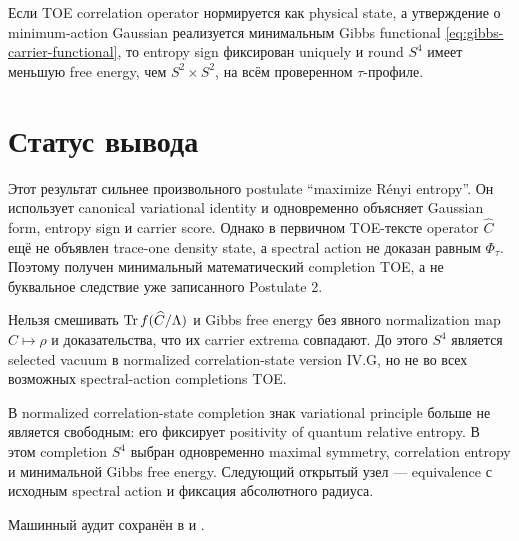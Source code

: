 \begin{proposition}
Если TOE correlation operator нормируется как physical state, а утверждение
о minimum-action Gaussian реализуется минимальным Gibbs functional
\eqref{eq:gibbs-carrier-functional}, то entropy sign фиксирован uniquely и
round \(S^4\) имеет меньшую free energy, чем
\(S^2\times S^2\), на всём проверенном \(\tau\)-профиле.
\end{proposition}

\section{Статус вывода}

Этот результат сильнее произвольного postulate ``maximize Rényi entropy''.
Он использует canonical variational identity и одновременно объясняет
Gaussian form, entropy sign и carrier score. Однако в первичном TOE-тексте
operator \(\widehat C\) ещё не объявлен trace-one density state, а spectral
action не доказан равным \(\Phi_\tau\). Поэтому получен минимальный
математический completion TOE, а не буквальное следствие уже записанного
Postulate 2.

\begin{nogocriterion}
Нельзя смешивать \(\operatorname{Tr} f(\widehat C/\Lambda)\) и Gibbs free energy без
явного normalization map \(\widehat C\mapsto\rho\) и доказательства, что
их carrier extrema совпадают. До этого \(S^4\) является selected vacuum
в normalized correlation-state version IV.G, но не во всех возможных
spectral-action completions TOE.
\end{nogocriterion}

\begin{theorem}
В normalized correlation-state completion знак variational principle больше
не является свободным: его фиксирует positivity of quantum relative
entropy. В этом completion \(S^4\) выбран одновременно maximal symmetry,
correlation entropy и минимальной Gibbs free energy. Следующий открытый узел
--- equivalence с исходным spectral action и фиксация абсолютного радиуса.
\end{theorem}

Машинный аудит сохранён в
 и
.